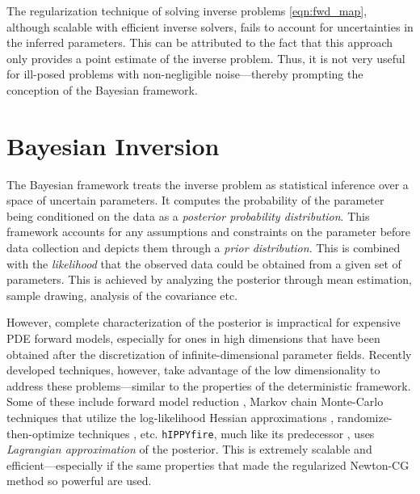 The regularization technique of solving inverse problems \eqref{eqn:fwd_map}, although scalable with efficient inverse solvers, fails to account for uncertainties in the inferred parameters. This can be attributed to the fact that this approach only provides a point estimate of the inverse problem. Thus, it is not very useful for ill-posed problems with non-negligible noise---thereby prompting the conception of the Bayesian framework.

\section{Bayesian Inversion}
\label{sec:bayesian_inversion}
The Bayesian framework treats the inverse problem as statistical inference over a space of uncertain parameters. It computes the probability of the parameter being conditioned on the data as a \textit{posterior probability distribution}. This framework accounts for any assumptions and constraints on the parameter before data collection and depicts them through a \textit{prior distribution}. This is combined with the \textit{likelihood} that the observed data could be obtained from a given set of parameters. This is achieved by analyzing the posterior through mean estimation, sample drawing, analysis of the covariance etc.

However, complete characterization of the posterior is impractical for expensive PDE forward models, especially for ones in high dimensions that have been obtained after the discretization of infinite-dimensional parameter fields. Recently developed techniques, however, take advantage of the low dimensionality to address these problems---similar to the properties of the deterministic framework. Some of these include forward model reduction \cite{galbally2010non}, Markov chain Monte-Carlo techniques that utilize the log-likelihood Hessian approximations \cite{petra2012inexact}, randomize-then-optimize techniques \cite{wang2018randomized}, etc. \texttt{hIPPYfire}, much like its predecessor \cite{villa2018hippylib}, uses \textit{Lagrangian approximation} of the posterior. This is extremely scalable and efficient---especially if the same properties that made the regularized Newton-CG method so powerful are used.

